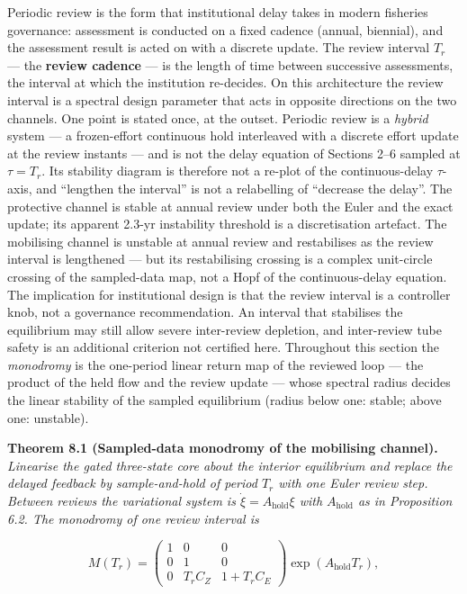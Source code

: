 \documentclass[11pt]{article}
\begin{document}
Periodic review is the form that institutional delay takes in modern
fisheries governance: assessment is conducted on a fixed cadence
(annual, biennial), and the assessment result is acted on with a
discrete update. The review interval \(T_r\) --- the \textbf{review
cadence} --- is the length of time between successive assessments, the
interval at which the institution re-decides. On this architecture the
review interval is a spectral design parameter that acts in opposite
directions on the two channels. One point is stated once, at the outset.
Periodic review is a \emph{hybrid} system --- a frozen-effort continuous
hold interleaved with a discrete effort update at the review instants
--- and is not the delay equation of Sections 2--6 sampled at
\(\tau = T_r\). Its stability diagram is therefore not a re-plot of the
continuous-delay \(\tau\)-axis, and ``lengthen the interval'' is not a
relabelling of ``decrease the delay''. The protective channel is stable
at annual review under both the Euler and the exact update; its apparent
2.3-yr instability threshold is a discretisation artefact. The
mobilising channel is unstable at annual review and restabilises as the
review interval is lengthened --- but its restabilising crossing is a
complex unit-circle crossing of the sampled-data map, not a Hopf of the
continuous-delay equation. The implication for institutional design is
that the review interval is a controller knob, not a governance
recommendation. An interval that stabilises the equilibrium may still
allow severe inter-review depletion, and inter-review tube safety is an
additional criterion not certified here. Throughout this section the
\emph{monodromy} is the one-period linear return map of the reviewed
loop --- the product of the held flow and the review update --- whose
spectral radius decides the linear stability of the sampled equilibrium
(radius below one: stable; above one: unstable).

\textbf{Theorem 8.1 (Sampled-data monodromy of the mobilising channel).}
\emph{Linearise the gated three-state core about the interior
equilibrium and replace the delayed feedback by sample-and-hold of
period \(T_r\) with one Euler review step. Between reviews the
variational system is \(\dot\xi = A_{\mathrm{hold}}\xi\) with
\(A_{\mathrm{hold}}\) as in Proposition 6.2. The monodromy of one review
interval is}

\[M(T_r) = \begin{pmatrix} 1 & 0 & 0 \\ 0 & 1 & 0 \\ 0 & T_r C_Z & 1 + T_r C_E \end{pmatrix} \exp(A_{\mathrm{hold}} T_r), \tag{12}\]
\end{document}
